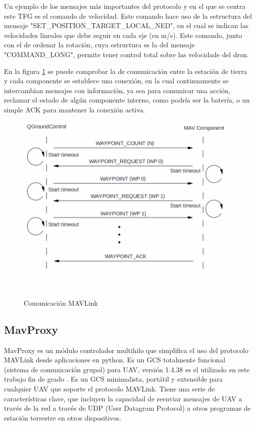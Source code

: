 Un ejemplo de los mensajes más importantes del protocolo y en el que se centra este TFG es el comando de velocidad. Este comando hace uso de la estructura del mensaje "SET\_POSITION\_TARGET\_LOCAL\_NED", en el cual se indican las velocidades lineales que debe seguir en cada eje (en m/s). Este comando, junto con el de ordenar la rotación, cuya estructura es la del mensaje "COMMAND\_LONG", permite tener control total sobre las velocidade del dron. 

En la figura \ref{fig:comunicacionMAVLink} se puede comprobar la de comunicación entre la estación de tierra y cada componente se establece una conexión, en la cual continuamente se intercambian mensajes con información, ya sea para comunicar una acción, reclamar el estado de algún componente interno, como podría ser la batería, o un simple ACK para mantener la conexión activa.


\begin{figure}[H]
  \centering
  \includegraphics[scale=0.5]{imagenes/comunicacionMavLink.png}
  \caption{Comunicación MAVLink}
  \label{fig:comunicacionMAVLink}
\end{figure}

\subsection{MavProxy}
\label{sec:MavProxy}

MavProxy es un módulo controlador multihilo que simplifica el uso del protocolo MAVLink desde aplicaciones en python. Es un GCS totalmente funcional (sistema de comunicación grupal) para UAV, versión
1.4.38 es el utilizado en este trabajo fin de grado . Es un GCS minimalista, portátil y extensible para
cualquier UAV que soporte el protocolo MAVLink. Tiene una serie de características clave, que incluyen
la capacidad de reenviar mensajes de UAV a través de la red a través de UDP (User Datagram
Protocol) a otros programas de estación terrestre en otros dispositivos.

